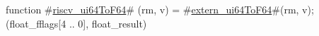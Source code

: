 function #\hyperref[sailRISCVzriscvzyui64ToF64]{riscv\_ui64ToF64}# (rm, v) = {
  #\hyperref[sailRISCVzexternzyui64ToF64]{extern\_ui64ToF64}#(rm, v);
  (float_fflags[4 .. 0], float_result)
}
